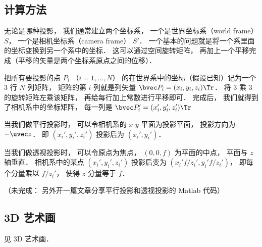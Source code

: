 \subsection{计算方法}
无论是哪种投影， 我们通常建立两个坐标系， 一个是世界坐标系（world frame） $S$， 一个是相机坐标系（camera frame）  $S'$． 一个基本的问题就是将一个系里面的坐标变换到另一个系中的坐标． 这可以通过空间旋转矩阵， 再加上一个平移完成（平移的矢量是两个坐标系原点之间的位移）．

把所有要投影的点 $P_i$ （$i = 1, \dots, N$） 的在世界系中的坐标（假设已知）记为一个 3 行 $N$ 列矩阵， 矩阵的第 $i$ 列就是列矢量 $\bvec P_i = (x_i, y_i, z_i)\Tr$． 将 3 乘 3 的旋转矩阵左乘该矩阵， 再给每行加上常数进行平移即可． 完成后， 我们就得到了相机系中的坐标矩阵， 每一列是 $\bvec P_i' = (x_i', y_i', z_i')\Tr$

当我们做平行投影时， 可以令相机系的 $x$-$y$ 平面为投影平面， 投影方向为 $-\uvec z$． 即 $(x_i', y_i', z_i')$ 投影后为 $(x_i', y_i')$．

当我们做透视投影时， 可以令原点为焦点， $(0, 0, f)$ 为平面的中点， 平面与 $z$ 轴垂直． 相机系中的某点 $(x_i', y_i', z_i')$ 投影后变为 $(x_i' f/z_i', y_i' f/z_i')$， 即每个分量乘以 $f/z_i'$， 使得 $z$ 分量等于 $f$．

（未完成： 另外开一篇文章分享平行投影和透视投影的 Matlab 代码）

\subsection{3D 艺术画}
见 3D 艺术画．
